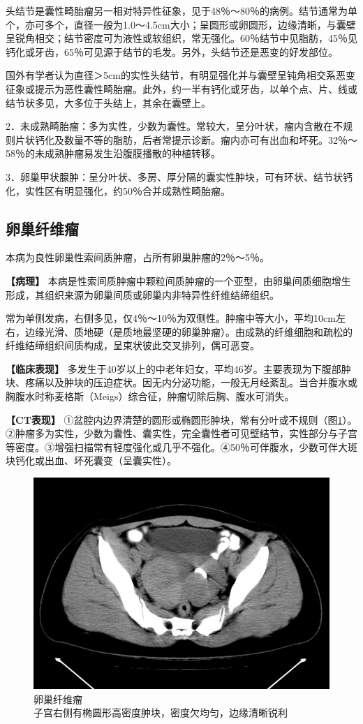 头结节是囊性畸胎瘤另一相对特异性征象，见于48％～80％的病例。结节通常为单个，亦可多个，直径一般为1.0～4.5cm大小；呈圆形或卵圆形，边缘清晰，与囊壁呈锐角相交；结节密度可为液性或软组织，常无强化。60％结节中见脂肪，45％见钙化或牙齿，65％可见源于结节的毛发。另外，头结节还是恶变的好发部位。

国外有学者认为直径＞5cm的实性头结节，有明显强化并与囊壁呈钝角相交系恶变征象或提示为恶性囊性畸胎瘤。此外，约一半有钙化或牙齿，以单个点、片、线或结节状多见，大多位于头结上，其余在囊壁上。

2．未成熟畸胎瘤：多为实性，少数为囊性。常较大，呈分叶状，瘤内含散在不规则片状钙化及数量不等的脂肪，后者常提示诊断。瘤内亦可有出血和坏死。32％～58％的未成熟肿瘤易发生沿腹膜播散的种植转移。

3．卵巢甲状腺肿：呈分叶状、多房、厚分隔的囊实性肿块，可有环状、结节状钙化，实性区有明显强化，约50％合并成熟性畸胎瘤。

\subsection{卵巢纤维瘤}

本病为良性卵巢性索间质肿瘤，占所有卵巢肿瘤的2％～5％。

\textbf{【病理】}
本病是性索间质肿瘤中颗粒间质肿瘤的一个亚型，由卵巢间质细胞增生形成，其组织来源为卵巢间质或卵巢内非特异性纤维结缔组织。

常为单侧发病，右侧多见，仅4％～10％为双侧性。肿瘤中等大小，平均10cm左右，边缘光滑、质地硬（是质地最坚硬的卵巢肿瘤）。由成熟的纤维细胞和疏松的纤维结缔组织间质构成，呈束状彼此交叉排列，偶可恶变。

\textbf{【临床表现】}
多发生于40岁以上的中老年妇女，平均46岁。主要表现为下腹部肿块、疼痛以及肿块的压迫症状。因无内分泌功能，一般无月经紊乱。当合并腹水或胸腹水时称麦格斯（Meigs）综合征，肿瘤切除后胸、腹水可消失。　

\textbf{【CT表现】}
①盆腔内边界清楚的圆形或椭圆形肿块，常有分叶或不规则（图\ref{fig21-14}）。②肿瘤多为实性，少数为囊性、囊实性，完全囊性者可见壁结节，实性部分与子宫等密度。③增强扫描常有轻度强化或几乎不强化。④50％可伴腹水，少数可伴大斑块钙化或出血、坏死囊变（呈囊实性）。

\begin{figure}[!htbp]
 \centering
 \includegraphics[width=.7\textwidth,height=\textheight,keepaspectratio]{./images/Image00412.jpg}
 \captionsetup{justification=centering}
 \caption{卵巢纤维瘤\\{\small 子宫右侧有椭圆形高密度肿块，密度欠均匀，边缘清晰锐利}}
 \label{fig21-14}
  \end{figure} 

